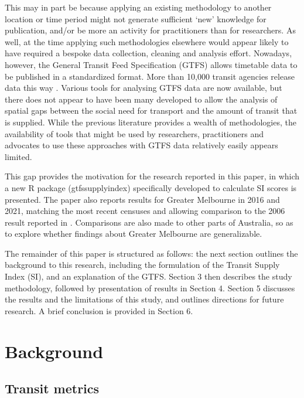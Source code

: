 \documentclass[preprint, 3p,
authoryear]{elsarticle} %
\begin{document}
This may in part be because applying an existing methodology to another
location or time period might not generate sufficient `new' knowledge
for publication, and/or be more an activity for practitioners than for
researchers. As well, at the time applying such methodologies elsewhere
would appear likely to have required a bespoke data collection, cleaning
and analysis effort. Nowadays, however, the General Transit Feed
Specification (GTFS) allows timetable data to be published in a
standardized format. More than 10,000 transit agencies release data this
way \citep{GTFS}. Various tools for analysing GTFS data are now
available, but there does not appear to have been many developed to
allow the analysis of spatial gaps between the social need for transport
and the amount of transit that is supplied. While the previous
literature provides a wealth of methodologies, the availability of tools
that might be used by researchers, practitioners and advocates to use
these approaches with GTFS data relatively easily appears limited.

This gap provides the motivation for the research reported in this
paper, in which a new R package (gtfssupplyindex) specifically developed
to calculate SI scores is presented. The paper also reports results for
Greater Melbourne in 2016 and 2021, matching the most recent censuses
and allowing comparison to the 2006 result reported in
\citet{currie2010identifying}. Comparisons are also made to other parts
of Australia, so as to explore whether findings about Greater Melbourne
are generalizable.

The remainder of this paper is structured as follows: the next section
outlines the background to this research, including the formulation of
the Transit Supply Index (SI), and an explanation of the GTFS. Section 3
then describes the study methodology, followed by presentation of
results in Section 4. Section 5 discusses the results and the
limitations of this study, and outlines directions for future research.
A brief conclusion is provided in Section 6.

\hypertarget{background}{%
\section{Background}\label{background}}

\hypertarget{transit-metrics}{%
\subsection{Transit metrics}\label{transit-metrics}}
\end{document}
